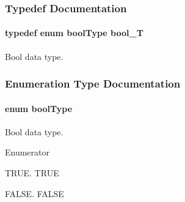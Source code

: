 \subsubsection{Typedef Documentation}
\hypertarget{group__template__compiler_ga74fbee312f9185efb602f89d21b53404}{
\paragraph[{bool\-\_\-\-T}]{\setlength{\rightskip}{0pt plus 5cm}typedef enum {\bf bool\-Type}  {\bf bool\-\_\-\-T}}}\label{group__template__compiler_ga74fbee312f9185efb602f89d21b53404}


Bool data type. 



\subsubsection{Enumeration Type Documentation}
\hypertarget{group__template__compiler_ga05f6c3f21a0d28271ad754637673d8fa}{
\paragraph[{bool\-Type}]{\setlength{\rightskip}{0pt plus 5cm}enum {\bf bool\-Type}}}\label{group__template__compiler_ga05f6c3f21a0d28271ad754637673d8fa}


Bool data type. 

\begin{Desc}
\item[Enumerator]\par
\begin{description}
\item[{\em 
\hypertarget{group__template__compiler_gga05f6c3f21a0d28271ad754637673d8faaa82764c3079aea4e60c80e45befbb839}{T\-R\-U\-E}\label{group__template__compiler_gga05f6c3f21a0d28271ad754637673d8faaa82764c3079aea4e60c80e45befbb839}
}]T\-R\-U\-E. T\-R\-U\-E \item[{\em 
\hypertarget{group__template__compiler_gga05f6c3f21a0d28271ad754637673d8faaa1e095cc966dbecf6a0d8aad75348d1a}{F\-A\-L\-S\-E}\label{group__template__compiler_gga05f6c3f21a0d28271ad754637673d8faaa1e095cc966dbecf6a0d8aad75348d1a}
}]F\-A\-L\-S\-E. F\-A\-L\-S\-E \end{description}
\end{Desc}
